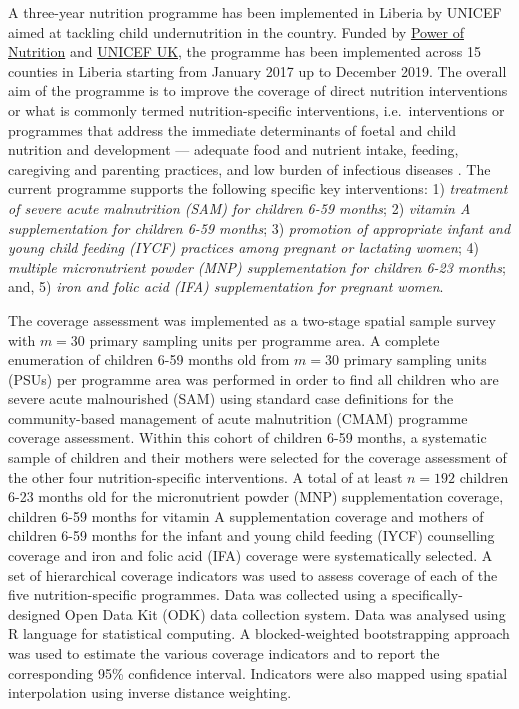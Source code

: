 \documentclass[12pt,a4paper]{article}
\begin{document}
A three-year nutrition programme has been implemented in Liberia by UNICEF aimed at tackling child undernutrition in the country. Funded by \href{http://www.powerofnutrition.org}{Power of Nutrition} and \href{https://www.unicef.org.uk}{UNICEF UK}, the programme has been implemented across 15 counties in Liberia starting from January 2017 up to December 2019. The overall aim of the programme is to improve the coverage of direct nutrition interventions or what is commonly termed nutrition-specific interventions, i.e.~interventions or programmes that address the immediate determinants of foetal and child nutrition and development --- adequate food and nutrient intake, feeding, caregiving and parenting practices, and low burden of infectious diseases \citep{Bhutta:2013ks, Ruel:2013kr}. The current programme supports the following specific key interventions: 1) \emph{treatment of severe acute malnutrition (SAM) for children 6-59 months}; 2) \emph{vitamin A supplementation for children 6-59 months}; 3) \emph{promotion of appropriate infant and young child feeding (IYCF) practices among pregnant or lactating women}; 4) \emph{multiple micronutrient powder (MNP) supplementation for children 6-23 months}; and, 5) \emph{iron and folic acid (IFA) supplementation for pregnant women}.

The coverage assessment was implemented as a two-stage spatial sample survey with \(m = 30\) primary sampling units per programme area. A complete enumeration of children 6-59 months old from \(m = 30\) primary sampling units (PSUs) per programme area was performed in order to find all children who are severe acute malnourished (SAM) using standard case definitions for the community-based management of acute malnutrition (CMAM) programme coverage assessment. Within this cohort of children 6-59 months, a systematic sample of children and their mothers were selected for the coverage assessment of the other four nutrition-specific interventions. A total of at least \(n = 192\) children 6-23 months old for the micronutrient powder (MNP) supplementation coverage, children 6-59 months for vitamin A supplementation coverage and mothers of children 6-59 months for the infant and young child feeding (IYCF) counselling coverage and iron and folic acid (IFA) coverage were systematically selected. A set of hierarchical coverage indicators was used to assess coverage of each of the five nutrition-specific programmes. Data was collected using a specifically-designed Open Data Kit (ODK) data collection system. Data was analysed using R language for statistical computing. A blocked-weighted bootstrapping approach was used to estimate the various coverage indicators and to report the corresponding 95\% confidence interval. Indicators were also mapped using spatial interpolation using inverse distance weighting.
\end{document}
